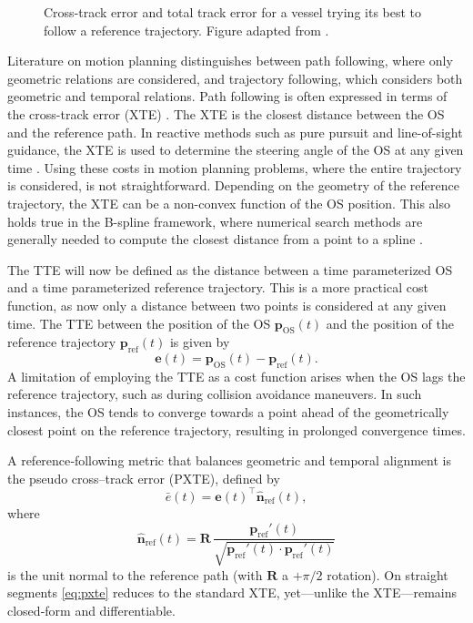 \begin{figure}
    \centering
    
    \caption{Cross-track error and total track error for a vessel trying its best to follow a reference trajectory. Figure adapted from \cite{prosjektoppgave}.}
    \label{fig:cross-track-along-track-error}
\end{figure}

Literature on motion planning distinguishes between path following, where only geometric relations are considered, and trajectory following, which considers both geometric and temporal relations. 
Path following is often expressed in terms of the cross-track error (XTE) \citep{Fossen2011-Handbook}. The XTE is the closest distance between the \acrshort{OS} and the reference path. In reactive methods such as pure pursuit and line-of-sight guidance, the XTE is used to determine the steering angle of the \acrshort{OS} at any given time \citep{Fossen2011-Handbook}. 
Using these costs in motion planning problems, where the entire trajectory is considered, is not straightforward. Depending on the geometry of the reference trajectory, the XTE can be a non-convex function of the OS position. This also holds true in the B-spline framework, where numerical search methods are generally needed to compute the closest distance from a point to a spline \citep{johnson2005distance,hu2005second,chen2009computing}.

The \acrfull{TTE} will now be defined as the distance between a time parameterized OS and a time parameterized reference trajectory. This is a more practical cost function, as now only a distance between two points is considered at any given time. The TTE between the position of the OS $\mathbf p_\text{OS}(t)$ and the position of the reference trajectory $\mathbf p_\text{ref}(t)$ is given by
\begin{equation}\label{eq:total-track-error}
    \mathbf e(t) = \mathbf p_\text{OS}(t) - \mathbf p_\text{ref}(t).
\end{equation}
A limitation of employing the TTE as a cost function arises when the OS lags the reference trajectory, such as during collision avoidance maneuvers. In such instances, the OS tends to converge towards a point ahead of the geometrically closest point on the reference trajectory, resulting in prolonged convergence times. 

A reference‐following metric that balances geometric and temporal alignment is the pseudo cross–track error (PXTE), defined by
\begin{equation}\label{eq:pxte}
  \bar e(t)
  = \mathbf e(t)^\top
    \mathbf{\hat n}_{\mathrm{ref}}(t),
\end{equation}
where
\begin{equation}\label{eq:reference-normal-pxte}
  \mathbf{\hat n}_{\mathrm{ref}}(t)
  = \mathbf R\,\frac{\mathbf p_{\mathrm{ref}}'(t)}{\sqrt{\mathbf p_{\mathrm{ref}}'(t) \cdot \mathbf p_{\mathrm{ref}}'(t)}}
\end{equation}
is the unit normal to the reference path (with $\mathbf R$ a $+\pi/2$ rotation).  On straight segments \cref{eq:pxte} reduces to the standard XTE, yet---unlike the XTE---remains closed‐form and differentiable.


